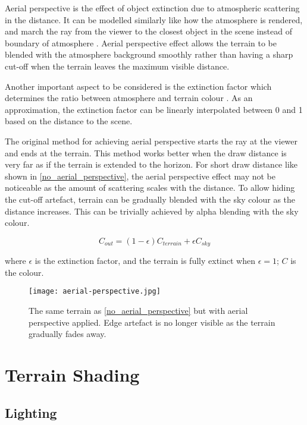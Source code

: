 \documentclass[oneside, a4paper]{report}
\begin{document}
    Aerial perspective is the effect of object extinction due to atmospheric scattering in the distance. It can be modelled similarly like how the atmosphere is rendered, and march the ray from the viewer to the closest object in the scene instead of boundary of atmosphere \cite{daylight_model}. Aerial perspective effect allows the terrain to be blended with the atmosphere background smoothly rather than having a sharp cut-off when the terrain leaves the maximum visible distance.

    Another important aspect to be considered is the extinction factor which determines the ratio between atmosphere and terrain colour \cite{daylight_model}. As an approximation, the extinction factor can be linearly interpolated between 0 and 1 based on the distance to the scene.

    The original method for achieving aerial perspective starts the ray at the viewer and ends at the terrain. This method works better when the draw distance is very far as if the terrain is extended to the horizon. For short draw distance like shown in \ref{no_aerial_perspective}, the aerial perspective effect may not be noticeable as the amount of scattering scales with the distance. To allow hiding the cut-off artefact, terrain can be gradually blended with the sky colour as the distance increases. This can be trivially achieved by alpha blending with the sky colour.

    \begin{equation}
        C_{out} = (1 - \epsilon) C_{terrain} + \epsilon C_{sky}
    \end{equation}

    where $\epsilon$ is the extinction factor, and the terrain is fully extinct when \(\epsilon = 1\); $C$ is the colour.

    \begin{figure}[H]
        \texttt{[image: aerial-perspective.jpg]}
        \caption{The same terrain as \ref{no_aerial_perspective} but with aerial perspective applied. Edge artefact is no longer visible as the terrain gradually fades away.}
    \end{figure}

    \section{Terrain Shading}

    \subsection{Lighting}
\end{document}
